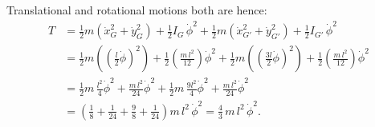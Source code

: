 Translational and rotational motions both are hence:
\begin{equation}
\begin{split}
T
&= \frac12 m\left(\dot x_G^2 + \dot y_G^2\right)
+ \frac12 I_G\,\dot\phi^2
+ \frac12 m\left(\dot x_{G'}^2 + \dot y_{G'}^2\right)
+ \frac12 I_{G'}\,\dot\phi^2 \\ 
&= \frac12 m\!\left(\left(\tfrac{l}{2}\dot\phi\right)^2\right)
+ \frac12\!\left(\frac{m\,l^2}{12}\right)\dot\phi^2
+ \frac12 m\!\left(\left(\tfrac{3l}{2}\dot\phi\right)^2\right)
+ \frac12\!\left(\frac{m\,l^2}{12}\right)\dot\phi^2 \\ 
&= \frac12 m\,\frac{l^2}{4}\dot\phi^2
+ \frac{m\,l^2}{24}\dot\phi^2
+ \frac12 m\,\frac{9l^2}{4}\dot\phi^2
+ \frac{m\,l^2}{24}\dot\phi^2 \\ 
&= \left(\frac{1}{8} + \frac{1}{24} + \frac{9}{8} + \frac{1}{24}\right)m\,l^2\,\dot\phi^2
= \frac{4}{3}\,m\,l^2\,\dot\phi^2.
\end{split}
\end{equation}
